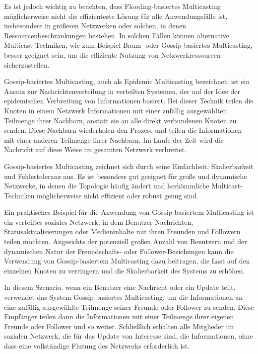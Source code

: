 Es ist jedoch wichtig zu beachten, dass Flooding-basiertes Multicasting möglicherweise nicht die effizienteste Lösung für alle Anwendungsfälle ist, insbesondere in größeren Netzwerken oder solchen, in denen Ressourcenbeschränkungen bestehen. In solchen Fällen können alternative Multicast-Techniken, wie zum Beispiel Baum- oder Gossip-basiertes Multicasting, besser geeignet sein, um die effiziente Nutzung von Netzwerkressourcen sicherzustellen.

Gossip-basiertes Multicasting, auch als Epidemic Multicasting bezeichnet, ist ein Ansatz zur Nachrichtenverteilung in verteilten Systemen, der auf der Idee der epidemischen Verbreitung von Informationen basiert. Bei dieser Technik teilen die Knoten in einem Netzwerk Informationen mit einer zufällig ausgewählten Teilmenge ihrer Nachbarn, anstatt sie an alle direkt verbundenen Knoten zu senden. Diese Nachbarn wiederholen den Prozess und teilen die Informationen mit einer anderen Teilmenge ihrer Nachbarn. Im Laufe der Zeit wird die Nachricht auf diese Weise im gesamten Netzwerk verbreitet.

Gossip-basiertes Multicasting zeichnet sich durch seine Einfachheit, Skalierbarkeit und Fehlertoleranz aus. Es ist besonders gut geeignet für große und dynamische Netzwerke, in denen die Topologie häufig ändert und herkömmliche Multicast-Techniken möglicherweise nicht effizient oder robust genug sind.

Ein praktisches Beispiel für die Anwendung von Gossip-basiertem Multicasting ist ein verteiltes soziales Netzwerk, in dem Benutzer Nachrichten, Statusaktualisierungen oder Medieninhalte mit ihren Freunden und Followern teilen möchten. Angesichts der potenziell großen Anzahl von Benutzern und der dynamischen Natur der Freundschafts- oder Follower-Beziehungen kann die Verwendung von Gossip-basiertem Multicasting dazu beitragen, die Last auf den einzelnen Knoten zu verringern und die Skalierbarkeit des Systems zu erhöhen.

In diesem Szenario, wenn ein Benutzer eine Nachricht oder ein Update teilt, verwendet das System Gossip-basiertes Multicasting, um die Informationen an eine zufällig ausgewählte Teilmenge seiner Freunde oder Follower zu senden. Diese Empfänger teilen dann die Informationen mit einer Teilmenge ihrer eigenen Freunde oder Follower und so weiter. Schließlich erhalten alle Mitglieder im sozialen Netzwerk, die für das Update von Interesse sind, die Informationen, ohne dass eine vollständige Flutung des Netzwerks erforderlich ist.

